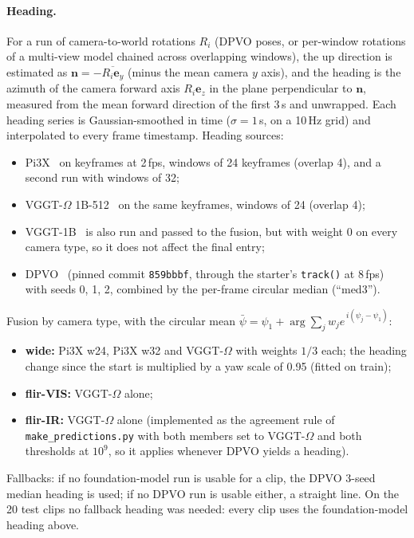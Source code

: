 \documentclass[11pt]{article}
\begin{document}
\paragraph{Heading.}
For a run of camera-to-world rotations $R_i$ (DPVO poses, or per-window rotations of a multi-view model chained
across overlapping windows), the up direction is estimated as $\mathbf n=-\overline{R_i\mathbf e_y}$ (minus the
mean camera $y$ axis), and the heading is the azimuth of the camera forward axis $R_i\mathbf e_z$ in the plane
perpendicular to $\mathbf n$, measured from the mean forward direction of the first 3\,s and unwrapped. Each
heading series is Gaussian-smoothed in time ($\sigma=1$\,s, on a 10\,Hz grid) and interpolated to every frame
timestamp. Heading sources:
\begin{itemize}[nosep]
  \item Pi3X~\cite{wang2025pi3,pi3x2025} on keyframes at 2\,fps, windows of 24 keyframes (overlap 4), and a second
    run with windows of 32;
  \item VGGT-$\Omega$ 1B-512~\cite{wang2026vggtomega} on the same keyframes, windows of 24 (overlap 4);
  \item VGGT-1B~\cite{wang2025vggt} is also run and passed to the fusion, but with weight 0 on every camera type,
    so it does not affect the final entry;
  \item DPVO~\cite{teed2023deep} (pinned commit \texttt{859bbbf}, through the starter's \texttt{track()} at 8\,fps)
    with seeds 0, 1, 2, combined by the per-frame circular median (``med3'').
\end{itemize}
Fusion by camera type, with the circular mean
$\bar\psi=\psi_1+\arg\sum_j w_j e^{\,i(\psi_j-\psi_1)}$:
\begin{itemize}[nosep]
  \item \textbf{wide:} Pi3X w24, Pi3X w32 and VGGT-$\Omega$ with weights $1/3$ each; the heading change since the
    start is multiplied by a yaw scale of 0.95 (fitted on train);
  \item \textbf{flir-VIS:} VGGT-$\Omega$ alone;
  \item \textbf{flir-IR:} VGGT-$\Omega$ alone (implemented as the agreement rule of \texttt{make\_predictions.py}
    with both members set to VGGT-$\Omega$ and both thresholds at $10^9$, so it applies whenever DPVO yields a heading).
\end{itemize}
Fallbacks: if no foundation-model run is usable for a clip, the DPVO 3-seed median heading is used; if no DPVO
run is usable either, a straight line. On the 20 test clips no fallback heading was needed: every clip uses the
foundation-model heading above.
\end{document}
